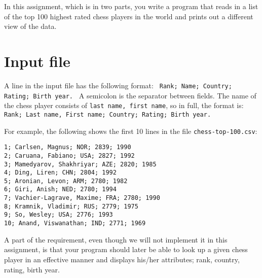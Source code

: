 
In this assignment, which is in two parts,
you write a program that reads in a list of the top 100 highest rated chess players in the world
and prints out a different view of the data.

\section*{Input file}

A line in the input file has the following format:
\texttt{
    Rank; Name; Country; Rating; Birth year.
}
A semicolon is the separator between fields.
The name of the chess player consists of \texttt{last name, first name},
so in full, the format is:
\texttt{
    Rank; Last name, First name; Country; Rating; Birth year.
}

For example, the following shows the first 10 lines
in the file \texttt{chess-top-100.csv}:

\begin{verbatim}
1; Carlsen, Magnus; NOR; 2839; 1990
2; Caruana, Fabiano; USA; 2827; 1992
3; Mamedyarov, Shakhriyar; AZE; 2820; 1985
4; Ding, Liren; CHN; 2804; 1992
5; Aronian, Levon; ARM; 2780; 1982
6; Giri, Anish; NED; 2780; 1994
7; Vachier-Lagrave, Maxime; FRA; 2780; 1990
8; Kramnik, Vladimir; RUS; 2779; 1975
9; So, Wesley; USA; 2776; 1993
10; Anand, Viswanathan; IND; 2771; 1969
\end{verbatim}

A part of the requirement,
even though we will not implement it in this assignment,
is that your program should later be able to
look up a given chess player in an effective manner
and displays his/her attributes;
rank, country, rating, birth year.
